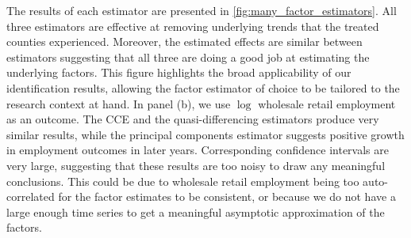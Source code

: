 \documentclass[12pt]{article}
\begin{document}
The results of each estimator are presented in \autoref{fig:many_factor_estimators}. All three estimators are effective at removing underlying trends that the treated counties experienced. Moreover, the estimated effects are similar between estimators suggesting that all three are doing a good job at estimating the underlying factors. This figure highlights the broad applicability of our identification results, allowing the factor estimator of choice to be tailored to the research context at hand. In panel (b), we use $\log$ wholesale retail employment as an outcome. The CCE and the quasi-differencing estimators produce very similar results, while the principal components estimator suggests positive growth in employment outcomes in later years. Corresponding confidence intervals are very large, suggesting that these results are too noisy to draw any meaningful conclusions. This could be due to wholesale retail employment being too auto-correlated for the factor estimates to be consistent, or because we do not have a large enough time series to get a meaningful asymptotic approximation of the factors.
\end{document}
